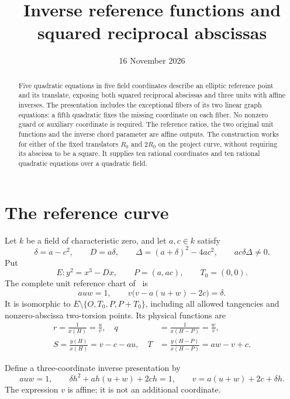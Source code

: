 \documentclass[11pt,a4paper]{article}
\title{Inverse reference functions and squared reciprocal abscissas}
\author{}\date{16 November 2026}
\begin{document}
\maketitle
\begin{abstract}
Five quadratic equations in five field coordinates describe an elliptic
reference point and its translate, exposing both squared reciprocal
abscissas and three units with affine inverses. The presentation includes
the exceptional fibers of its two linear graph equations: a fifth
quadratic fixes the missing coordinate on each fiber. No nonzero guard
or auxiliary coordinate is required. The reference ratios, the two
original unit functions and the inverse chord parameter are affine
outputs. The construction works for either of the fixed translators
$R_0$ and $2R_0$ on the project curve, without requiring its abscissa
to be a square. It supplies ten rational coordinates and ten rational
quadratic equations over a quadratic field.
\end{abstract}

\section{The reference curve}
Let $k$ be a field of characteristic zero, and let $a,c\in k$ satisfy
\begin{equation}\label{eq:constants}
 \delta=a-c^2,\qquad D=a\delta,\qquad
 \Delta=(a+\delta)^2-4ac^2,\qquad ac\delta\Delta\ne0.
\end{equation}
Put
\[
 E:y^2=x^3-Dx,\qquad P=(a,ac),\qquad T_0=(0,0).
\]
The complete unit reference chart of~\cite{Unit} is
\begin{equation}\label{eq:old}
 auw=1,\qquad v\bigl(v-a(u+w)-2c\bigr)=\delta.
\end{equation}
It is isomorphic to $E\setminus\{O,T_0,P,P+T_0\}$, including
all allowed tangencies and nonzero-abscissa two-torsion points.
Its physical functions are
\begin{equation}\label{eq:physical}
\begin{aligned}
 r=\frac1{x(H)}=\frac uv,\quad
 q&=\frac1{x(H-P)}=\frac wv,\\
 S=\frac{y(H)}{x(H)}=v-c-au,\quad
 T&=\frac{y(H-P)}{x(H-P)}=aw-v+c.
\end{aligned}
\end{equation}

Define a three-coordinate inverse presentation by
\begin{equation}\label{eq:base}
 auw=1,\qquad \delta h^2+ah(u+w)+2ch=1,
 \qquad v=a(u+w)+2c+\delta h.
\end{equation}
The expression $v$ is affine; it is not an additional coordinate.
\end{document}
